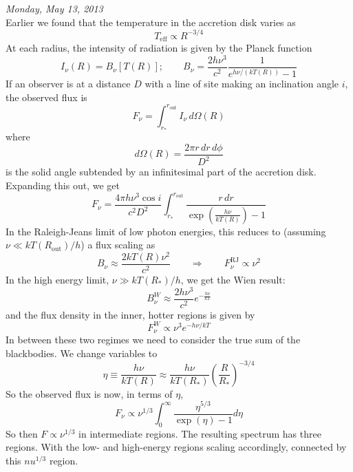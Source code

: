\documentclass[10pt]{article}
\numberwithin{equation}{section}
\newcommand{\n}{\noindent}
\begin{document}
	
	
\n\textit{Monday, May 13, 2013}\\
\n Earlier we found that the temperature in the accretion disk varies as
\begin{equation}
	\label{eq:acc2:1}T_{\mathrm{eff}} \propto R^{-3/4}
\end{equation}
At each radius, the intensity of radiation is given by the Planck function
\begin{equation}
	\label{eq:acc2:2} I_\nu(R) = B_\nu[T(R)]; \qquad B_\nu = \frac{2h\nu^3}{c^2}\frac{1}{e^{h\nu/(kT(R))}-1}
\end{equation}
If an observer is at a distance $D$ with a line of site making an inclination angle $i$, the observed flux is
\begin{equation}
	\label{eq:acc2:3} F_\nu = \int_{r_*}^{r_{\mathrm{out}}} I_\nu\,d\Omega(R)
\end{equation}
where
\begin{equation}
	\label{eq:acc2:4} d\Omega(R) = \frac{2\pi r\,dr\,d\phi}{D^2}
\end{equation}
is the solid angle subtended by an infinitesimal part of the accretion disk. Expanding this out, we get
\begin{equation}
	\label{eq:acc2:4b} F_\nu = \frac{4\pi h\nu^3\cos i}{c^2D^2}\int_{r_*}^{r_{\mathrm{out}}} \frac{r\,dr}{\exp\left(\frac{h\nu}{kT(R)}\right)-1}
\end{equation}
In the Raleigh-Jeans limit of low photon energies, this reduces to (assuming $\nu \ll kT(R_{\mathrm{out}})/h$) a flux scaling as
\begin{equation}
	\label{eq:acc2:5} B_\nu \approx \frac{2kT(R)\nu^2}{c^2} \qquad \Rightarrow \qquad F_\nu^{\mathrm{RJ}}\propto \nu^2
\end{equation}
In the high energy limit, $\nu \gg kT(R_*)/h$, we get the Wien result:
\begin{equation}
	\label{eq:acc2:6} B_\nu^W \approx \frac{2h\nu^3}{c^2} e^{-\frac{h\nu}{kT}}
\end{equation}
and the flux density in the inner, hotter regions is given by
\begin{equation}
	\label{eq:acc2:7} F_\nu^W \propto \nu^3 e^{-h\nu/kT}
\end{equation}
In between these two regimes we need to consider the true sum of the blackbodies. We change variables to 
\begin{equation}
	\label{eq:acc2:8} \eta\equiv \frac{h\nu}{kT(R)} \approx \frac{h\nu}{kT(R_*)}\left(\frac{R}{R_*}\right)^{-3/4}
\end{equation}
So the observed flux is now, in terms of $\eta$,
\begin{equation}
	\label{eq:acc2:9} F_\nu \propto \nu^{1/3} \int_0^\infty \frac{\eta^{5/3}}{\exp(\eta) - 1}d\eta
\end{equation}
So then $F\propto \nu^{1/3}$ in intermediate regions. The resulting spectrum has three regions. With the low- and high-energy regions scaling accordingly, connected by this $nu^{1/3}$ region.
\end{document}
